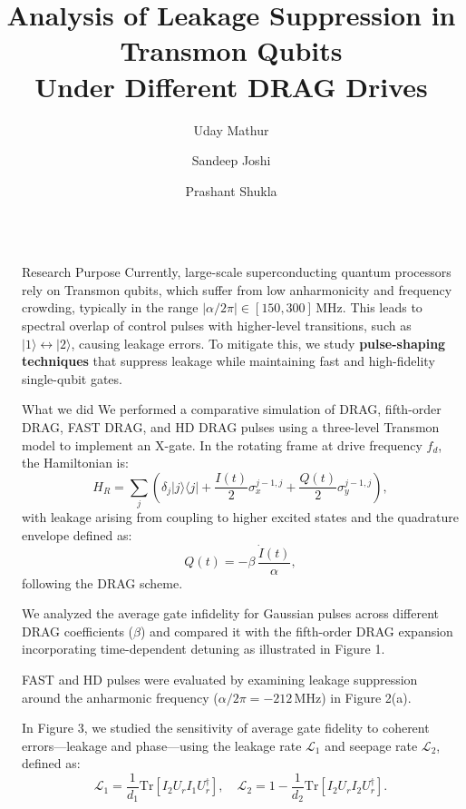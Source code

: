 \documentclass[final]{beamer}
\title{\centering Analysis of Leakage Suppression in Transmon Qubits \\ Under Different DRAG Drives}
\author{Uday Mathur \inst{1} \and Sandeep Joshi \inst{2} \and Prashant Shukla \inst{2}}
\institute[shortinst]{
    \inst{1} Dept. of Physics, Indian Institute of Technology (BHU), Varanasi, India
    \samelineand
    \inst{2} Nuclear Physics Division, Bhabha Atomic Research Centre, Mumbai, India
}
\newlength{\sepwidth}
\newlength{\colwidth}
\newcommand{\separatorcolumn}{\begin{column}{\sepwidth}\end{column}}
\begin{document}

\begin{frame}[t]
    \begin{columns}[t]

        \separatorcolumn
        \begin{column}{\colwidth}

            \begin{block}{Research Purpose}
                Currently, large-scale superconducting quantum processors rely on Transmon qubits, which suffer from low anharmonicity and frequency crowding, typically in the range \(|\alpha/2\pi| \in [150, 300]\,\text{MHz}\). This leads to spectral overlap of control pulses with higher-level transitions, such as \(|1\rangle \leftrightarrow |2\rangle\), causing leakage errors. To mitigate this, we study \textbf{pulse-shaping techniques} that suppress leakage while maintaining fast and high-fidelity single-qubit gates.
            \end{block}

            \begin{block}{What we did}
                We performed a comparative simulation of DRAG, fifth-order DRAG, FAST DRAG, and HD DRAG pulses using a three-level Transmon model to implement an X-gate. In the rotating frame at drive frequency \(f_d\), the Hamiltonian is:
                \[
                H_R = \sum_j \left( \delta_j |j\rangle\langle j| + \frac{I(t)}{2}\sigma_x^{j-1,j} + \frac{Q(t)}{2}\sigma_y^{j-1,j} \right),
                \]
                with leakage arising from coupling to higher excited states and the quadrature envelope defined as:
                \[
                Q(t) = -\beta\, \frac{\dot{I}(t)}{\alpha},
                \]
                following the DRAG scheme.

                We analyzed the average gate infidelity for Gaussian pulses across different DRAG coefficients (\(\beta\)) and compared it with the fifth-order DRAG expansion incorporating time-dependent detuning as illustrated in Figure 1.

                FAST and HD pulses were evaluated by examining leakage suppression around the anharmonic frequency (\(\alpha/2\pi = -212\,\text{MHz}\)) in Figure 2(a).

                In Figure 3, we studied the sensitivity of average gate fidelity to coherent errors—leakage and phase—using the leakage rate \(\mathcal{L}_1\) and seepage rate \(\mathcal{L}_2\), defined as:
                \[
                \mathcal{L}_1 = \frac{1}{d_1} \mathrm{Tr}[I_2 U_r I_1 U_r^\dagger], \quad
                \mathcal{L}_2 = 1 - \frac{1}{d_2} \mathrm{Tr}[I_2 U_r I_2 U_r^\dagger].
                \]


\end{block}
\end{column}
\end{columns}
\end{frame}
\end{document}
